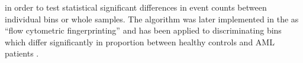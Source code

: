 in order to test statistical significant differences in event counts between individual bins or whole samples.
The algorithm was later implemented in the  as ``flow cytometric fingerprinting'' and has been
applied to discriminating bins which differ significantly in proportion between healthy controls and \gls{AML} patients
\citep{Rogers:2008ij,Rogers:2009jz}.


